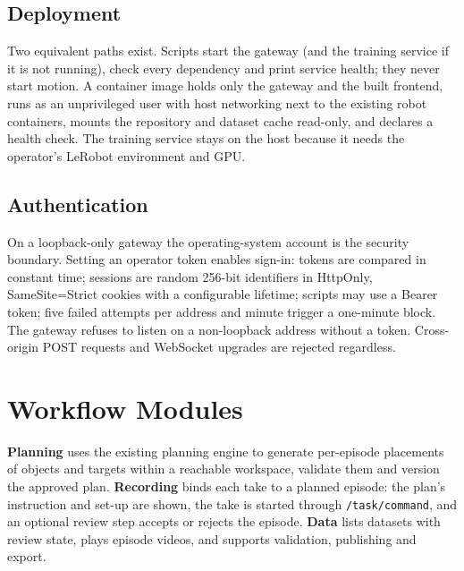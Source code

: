 \documentclass[conference]{IEEEtran}
\begin{document}
\subsection{Deployment}
Two equivalent paths exist. Scripts start the gateway (and the training service if it is not
running), check every dependency and print service health; they never start motion. A
container image holds only the gateway and the built frontend, runs as an unprivileged user with
host networking next to the existing robot containers, mounts the repository and dataset cache
read-only, and declares a health check. The training service stays on the host because it
needs the operator's LeRobot environment and GPU.

\subsection{Authentication}\label{sec:auth}
On a loopback-only gateway the operating-system account is the security boundary. Setting an
operator token enables sign-in: tokens are compared in constant time; sessions are random
256-bit identifiers in HttpOnly, SameSite=Strict cookies with a configurable lifetime; scripts
may use a Bearer token; five failed attempts per address and minute trigger a one-minute block.
The gateway refuses to listen on a non-loopback address without a token. Cross-origin POST
requests and WebSocket upgrades are rejected regardless.

\section{Workflow Modules}\label{sec:workflow}
\textbf{Planning} uses the existing planning engine to generate per-episode placements of
objects and targets within a reachable workspace, validate them and version the approved
plan. \textbf{Recording} binds each take to a planned episode: the plan's instruction and set-up
are shown, the take is started through \texttt{/task/command}, and an optional review step
accepts or rejects the episode. \textbf{Data} lists datasets with review state, plays episode
videos, and supports validation, publishing and export.
\end{document}
